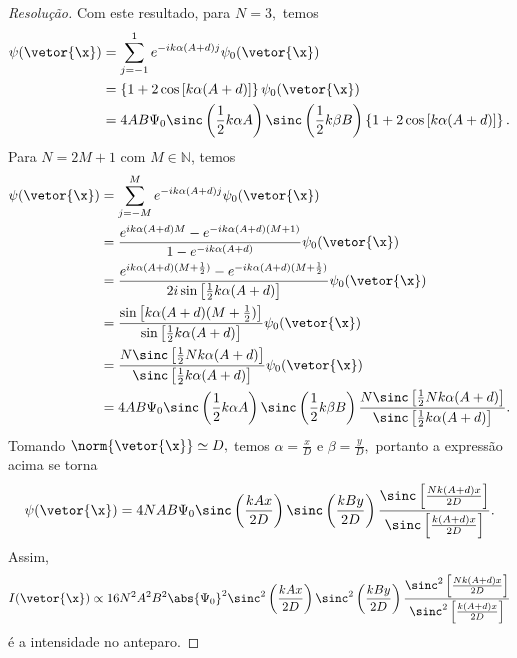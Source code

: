 \begin{proof}[Resolução]
    Com este resultado, para \(N = 3,\) temos
    \begin{align*}
        \psi(\vetor{\x}) &= \sum_{j = -1}^1 e^{-ik \alpha(A + d)j} \psi_0(\vetor{\x})\\
                         &= \left\{1 + 2\cos\left[k\alpha(A + d)\right]\right\} \psi_0(\vetor{\x})\\
                         &= 4 AB \Psi_0 \sinc\left(\frac12 k \alpha A\right)\sinc\left(\frac12 k \beta B\right) \left\{1 + 2\cos\left[k\alpha(A + d)\right]\right\}.
    \end{align*}
    Para \(N = 2M + 1\) com \(M \in \mathbb{N}\), temos
    \begin{align*}
        \psi(\vetor{\x}) &= \sum_{j = -M}^M e^{-ik \alpha(A + d)j} \psi_0(\vetor{\x})\\
                         &= \frac{e^{ik \alpha (A + d)M} - e^{-ik \alpha(A + d)(M+1)}}{1 - e^{-ik \alpha (A + d)}}\psi_0(\vetor{\x})\\
                         &= \frac{e^{ik \alpha (A + d) (M + \frac12)} - e^{-ik \alpha (A + d) (M + \frac12)}}{2i\sin\left[\frac12 k \alpha(A + d)\right]}\psi_0(\vetor{\x})\\
                         &= \frac{\sin\left[k \alpha (A + d) (M + \frac12)\right]}{\sin\left[\frac12 k \alpha (A + d)\right]} \psi_0(\vetor{\x})\\
                         &= \frac{N\sinc\left[\frac12 N k \alpha (A + d)\right]}{\sinc\left[\frac12 k \alpha (A + d)\right]} \psi_0(\vetor{\x})\\
                         &= 4AB \Psi_0 \sinc\left(\frac12 k \alpha A\right) \sinc\left(\frac12 k \beta B\right)\frac{N\sinc\left[\frac12 N k \alpha (A + d)\right]}{\sinc\left[\frac12 k \alpha (A + d)\right]}.
    \end{align*}
    Tomando \(\norm{\vetor{\x}} \simeq D,\) temos \(\alpha = \frac{x}{D}\) e \(\beta = \frac{y}{D},\) portanto a expressão acima se torna
    \begin{equation*}
        \psi(\vetor{\x}) = 4NAB \Psi_0 \sinc\left(\frac{k A x}{2 D}\right) \sinc\left(\frac{k B y}{2D}\right)\frac{\sinc\left[\frac{N k (A + d) x}{2D}\right]}{\sinc\left[\frac{k (A + d) x}{2D}\right]}.
    \end{equation*}
    Assim,
    \begin{equation*}
        I(\vetor{\x}) \propto 16 N^2 A^2B^2 \abs{\Psi_0}^2 \sinc^2\left(\frac{k A x}{2 D}\right) \sinc^2\left(\frac{k B y}{2D}\right)\frac{\sinc^2\left[\frac{N k (A + d) x}{2D}\right]}{\sinc^2\left[\frac{k (A + d) x}{2D}\right]}
    \end{equation*}
    é a intensidade no anteparo.
\end{proof}

